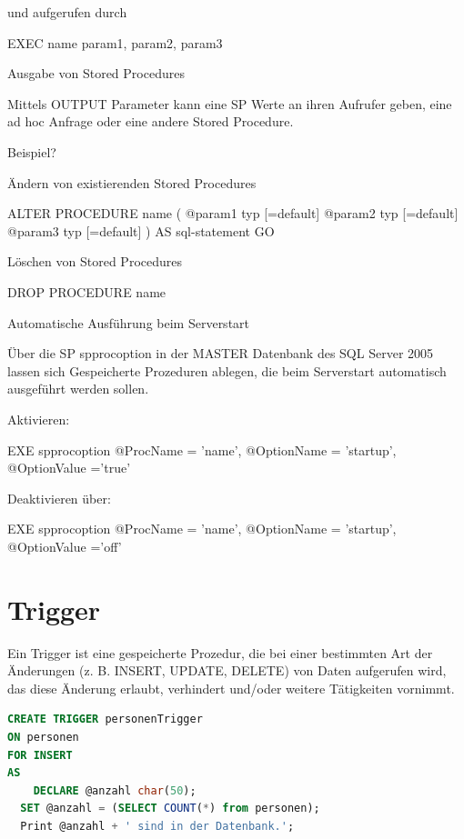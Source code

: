 \documentclass[12pt,ngerman,a4paper,index=totoc,twoside]{scrartcl}
\newcommand{\sql}[1]{\texttt{#1}}
\newcommand{\lwidth}{0.75}
\begin{document}
und aufgerufen durch

EXEC name param1, param2, param3

Ausgabe von Stored Procedures

Mittels OUTPUT Parameter kann eine SP Werte an ihren Aufrufer geben, eine ad hoc Anfrage oder eine andere Stored Procedure.

Beispiel?

Ändern von existierenden Stored Procedures

ALTER PROCEDURE name
(
@param1 typ [=default]
@param2 typ [=default]
@param3 typ [=default]
)
AS sql-statement
GO

Löschen von Stored Procedures

DROP PROCEDURE name

Automatische Ausführung beim Serverstart

Über die SP sp\textunderscore procoption in der MASTER Datenbank des SQL Server 2005 lassen sich Gespeicherte Prozeduren ablegen, die beim Serverstart automatisch ausgeführt werden sollen.

Aktivieren:

EXE sp\textunderscore procoption @ProcName = 'name', @OptionName = 'startup', @OptionValue ='true'

Deaktivieren über:

EXE sp\textunderscore procoption @ProcName = 'name', @OptionName = 'startup', @OptionValue ='off'

\section{Trigger}

Ein Trigger ist eine gespeicherte Prozedur, die bei einer bestimmten Art der Änderungen (z. B. INSERT, UPDATE, DELETE) von Daten aufgerufen wird, das diese Änderung erlaubt, verhindert und/oder weitere Tätigkeiten vornimmt.

\begin{center}
\begin{minipage}{\lwidth\textwidth}
\begin{lstlisting}[language={SQL},caption={Trigger, der nach dem \sql{INSERT} die Anzahl der Zeilen in der Tabelle ausgibt.},label={trigger:count}]
CREATE TRIGGER personenTrigger	
ON personen
FOR INSERT
AS
	DECLARE @anzahl char(50);
  SET @anzahl = (SELECT COUNT(*) from personen);
  Print @anzahl + ' sind in der Datenbank.'; 
\end{lstlisting}
\end{minipage}
\end{center} 
\end{document}
